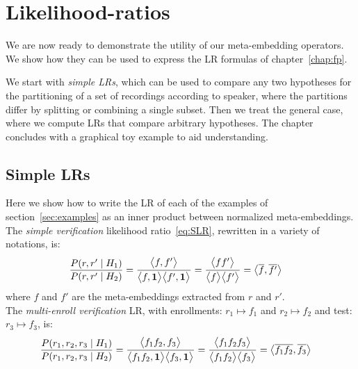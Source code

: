 \documentclass[a4paper,oneside,12pt,english]{report}
\def\expv#1#2{\bigl\langle#1\bigr\rangle_{#2}}
\def\dot#1#2{\expv{#1,#2}{}}
\def\normal#1{\overline{#1}}
\begin{document}
\chapter{Likelihood-ratios}
We are now ready to demonstrate the utility of our meta-embedding operators. We show how they can be used to express the LR formulas of chapter~\ref{chap:fp}. 

We start with \emph{simple LRs}, which can be used to compare any two hypotheses for the partitioning of a set of recordings according to speaker, where the partitions differ by splitting or combining a single subset. Then we treat the general case, where we compute LRs that compare arbitrary hypotheses. The chapter concludes with a graphical toy example to aid understanding.

 

\section{Simple LRs}
\label{sec:simpleLR}
Here we show how to write the LR of each of the examples of section~\ref{sec:examples} as an inner product between normalized meta-embeddings.\\

\noindent The \emph{simple verification} likelihood ratio~\eqref{eq:SLR}, rewritten in a variety of notations, is:
\begin{align}
\label{eq:slrdot}
\frac{P(r,r'\mid H_1)}{P(r,r'\mid H_2)} &= \frac{\dot{f}{f'}}{\dot{f}{\onevec}\dot{f'}{\onevec}}
= \frac{\expv{ff'}{}}{\expv{f}{}\expv{f'}{}}
= \dot{\normal{f}}{\normal{f'}}
\end{align}
where $f$ and $f'$ are the meta-embeddings extracted from $r$ and $r'$. \\

\noindent The \emph{multi-enroll verification} LR, with enrollments: $r_1\mapsto f_1$ and $r_2\mapsto f_2$ and test: $r_3\mapsto f_3$, is:
\begin{align}
\label{eq:mlrdot}
\frac{P(r_1,r_2,r_3\mid H_1)}{P(r_1,r_2,r_3\mid H_2)} &= \frac{\dot{f_1f_2}{f_3}}{\dot{f_1f_2}{\onevec}\dot{f_3}{\onevec}}
= \frac{\expv{f_1f_2f_3}{}}{\expv{f_1f_2}{}\expv{f_3}{}}
= \dot{\normal{f_1f_2}}{\normal{f_3}}
\end{align} \\
\end{document}
